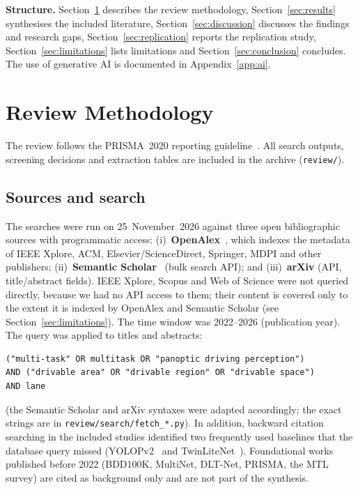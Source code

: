 \documentclass[journal,onecolumn]{IEEEtran}
\begin{document}
\textbf{Structure.} Section~\ref{sec:method} describes the review methodology, Section~\ref{sec:results} synthesises the included literature, Section~\ref{sec:discussion} discusses the findings and research gaps, Section~\ref{sec:replication} reports the replication study, Section~\ref{sec:limitations} lists limitations and Section~\ref{sec:conclusion} concludes. The use of generative AI is documented in Appendix~\ref{app:ai}.

\section{Review Methodology}\label{sec:method}
The review follows the PRISMA~2020 reporting guideline~\cite{page2021prisma}. All search outputs, screening decisions and extraction tables are included in the archive (\texttt{review/}).

\subsection{Sources and search}
The searches were run on 25~November~2026 against three open bibliographic sources with programmatic access:
(i)~\textbf{OpenAlex}~\cite{priem2022openalex}, which indexes the metadata of IEEE Xplore, ACM, Elsevier/ScienceDirect, Springer, MDPI and other publishers;
(ii)~\textbf{Semantic Scholar}~\cite{kinney2023s2} (bulk search API); and
(iii)~\textbf{arXiv} (API, title/abstract fields).
IEEE Xplore, Scopus and Web of Science were not queried directly, because we had no API access to them; their content is covered only to the extent it is indexed by OpenAlex and Semantic Scholar (see Section~\ref{sec:limitations}). The time window was 2022--2026 (publication year). The query was applied to titles and abstracts:
\begin{lstlisting}
("multi-task" OR multitask OR "panoptic driving perception")
AND ("drivable area" OR "drivable region" OR "drivable space")
AND lane
\end{lstlisting}
(the Semantic Scholar and arXiv syntaxes were adapted accordingly; the exact strings are in \texttt{review/search/fetch\_*.py}). In addition, backward citation searching in the included studies identified two frequently used baselines that the database query missed (YOLOPv2~\cite{han2022yolopv2} and TwinLiteNet~\cite{che2023twinlitenet}). Foundational works published before 2022 (BDD100K, MultiNet, DLT-Net, PRISMA, the MTL survey) are cited as background only and are not part of the synthesis.
\end{document}
